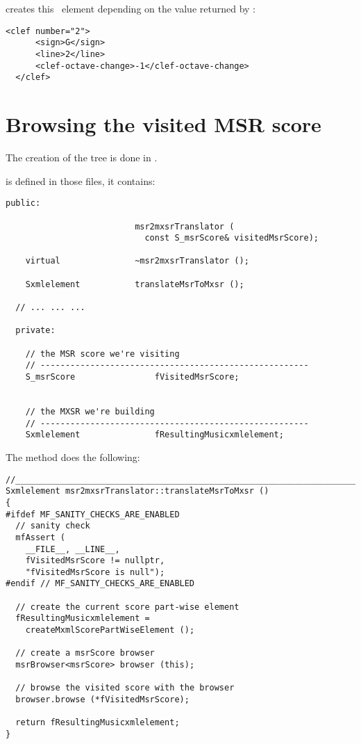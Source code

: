 creates this \mxml\ element depending on the value returned by :
\begin{lstlisting}[language=MusicXML]
 <clef number="2">
      <sign>G</sign>
      <line>2</line>
      <clef-octave-change>-1</clef-octave-change>
  </clef>

\end{lstlisting}

\section{Browsing the visited MSR score}

The creation of the tree is done in .

 is defined in those files, it contains:
\begin{lstlisting}[language=CPlusPlus]
  public:

                          msr2mxsrTranslator (
                            const S_msrScore& visitedMsrScore);

    virtual               ~msr2mxsrTranslator ();

    Sxmlelement           translateMsrToMxsr ();

  // ... ... ...

  private:

    // the MSR score we're visiting
    // ------------------------------------------------------
    S_msrScore                fVisitedMsrScore;


    // the MXSR we're building
    // ------------------------------------------------------
    Sxmlelement               fResultingMusicxmlelement;
\end{lstlisting}

The  method does the following:
\begin{lstlisting}[language=CPlusPlus]
//________________________________________________________________________
Sxmlelement msr2mxsrTranslator::translateMsrToMxsr ()
{
#ifdef MF_SANITY_CHECKS_ARE_ENABLED
  // sanity check
  mfAssert (
    __FILE__, __LINE__,
    fVisitedMsrScore != nullptr,
    "fVisitedMsrScore is null");
#endif // MF_SANITY_CHECKS_ARE_ENABLED

  // create the current score part-wise element
  fResultingMusicxmlelement =
    createMxmlScorePartWiseElement ();

  // create a msrScore browser
  msrBrowser<msrScore> browser (this);

  // browse the visited score with the browser
  browser.browse (*fVisitedMsrScore);

  return fResultingMusicxmlelement;
}
\end{lstlisting}


